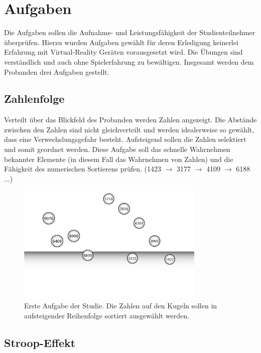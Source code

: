 \section{Aufgaben}\label{sec:tasks}

Die Aufgaben sollen die Aufnahme- und Leistungsfähigkeit der Studienteilnehmer überprüfen. Hierzu wurden Aufgaben gewählt für deren Erledigung keinerlei Erfahrung mit Virtual-Reality Geräten vorausgesetzt wird. 
Die Übungen sind verständlich und auch ohne Spielerfahrung zu bewältigen.
Insgesamt werden dem Probanden drei Aufgaben gestellt. 

\subsection{Zahlenfolge} 

Verteilt über das Blickfeld des Probanden werden Zahlen angezeigt. Die Abstände zwischen den Zahlen sind nicht gleichverteilt und werden idealerweise so gewählt, dass eine Verwechslungsgefahr besteht. 
Aufsteigend sollen die Zahlen selektiert und somit geordnet werden. Diese Aufgabe soll das schnelle Wahrnehmen bekannter Elemente (in diesem Fall das Wahrnehmen von Zahlen) und die Fähigkeit des numerischen Sortierens prüfen. 
(1423 $\rightarrow$ 3177 $\rightarrow$ 4109 $\rightarrow$ 6188 ...)

\begin{figure}[H]
	\centering
	\includegraphics[width=0.8\textwidth]{./images/ordering_abstract.png}
	\caption{Erste Aufgabe der Studie. Die Zahlen auf den Kugeln sollen in aufsteigender Reihenfolge sortiert ausgewählt werden.}
	\label{fig:ordeing_abstract}
\end{figure}

\subsection{Stroop-Effekt} 

